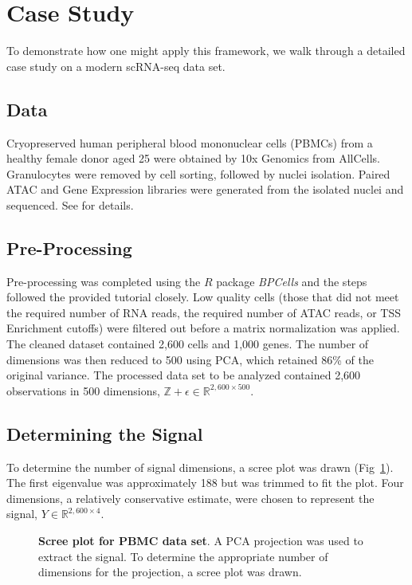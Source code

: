 \documentclass[10pt,letterpaper]{article}
\begin{document}
\section*{Case Study}
To demonstrate how one might apply this framework, we walk through a detailed case study on a modern scRNA-seq data set.

\subsection*{Data}
Cryopreserved human peripheral blood mononuclear cells (PBMCs) from a healthy female donor aged 25 were obtained by 10x Genomics from AllCells. Granulocytes were removed by cell sorting, followed by nuclei isolation. Paired ATAC and Gene Expression libraries were generated from the isolated nuclei and sequenced. See \cite{BPCells data} for details.

\subsection*{Pre-Processing}
Pre-processing was completed using the $R$ package \textit{BPCells} and the steps followed the provided tutorial \cite{BPCells tutorial} closely. Low quality cells (those that did not meet the required number of RNA reads, the required number of ATAC reads, or TSS Enrichment cutoffs) were filtered out before a matrix normalization was applied. The cleaned dataset contained 2,600 cells and 1,000 genes. The number of dimensions was then reduced to 500 using PCA, which retained 86\% of the original variance. The processed data set to be analyzed contained 2,600 observations in 500 dimensions, $\mathbb{Z + \epsilon} \in \mathbb{R}^{2,600 \times 500}$.

\subsection*{Determining the Signal}
To determine the number of signal dimensions, a scree plot was drawn (Fig~\ref{fig15}). The first eigenvalue was approximately 188 but was trimmed to fit the plot. Four dimensions, a relatively conservative estimate, were chosen to represent the signal, $Y \in \mathbb{R}^{2,600 \times 4}$.

\begin{figure}[!h]
\caption{{\bf Scree plot for PBMC data set}.
A PCA projection was used to extract the signal. To determine the appropriate number of dimensions for the projection, a scree plot was drawn.}
\label{fig15}
\end{figure}
\end{document}
